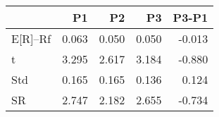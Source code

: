 \begin{tabular}{lrrrr}
\toprule
 & P1 & P2 & P3 & P3-P1 \\
\midrule
E[R]--Rf & 0.063 & 0.050 & 0.050 & -0.013 \\
t & 3.295 & 2.617 & 3.184 & -0.880 \\
Std & 0.165 & 0.165 & 0.136 & 0.124 \\
SR & 2.747 & 2.182 & 2.655 & -0.734 \\
\bottomrule
\end{tabular}
